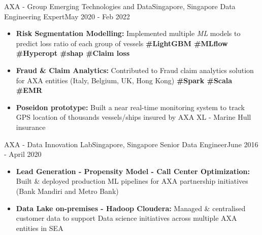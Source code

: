 
\resumeSubheading
{AXA - Group Emerging Technologies and Data}{Singapore, Singapore}
{Data Engineering Expert}{May 2020 - Feb 2022}
\begin{itemize}
    \item \textbf{Risk Segmentation Modelling:} Implemented multiple \emph{ML} models to predict loss ratio of each group of vessels \textbf{\scriptsize{\#LightGBM \#MLflow \#Hyperopt \#shap \#Claim loss}}
    \item \textbf{Fraud \& Claim Analytics:} Contributed to Fraud claim analytics solution for AXA entities (Italy, Belgium, UK, Hong Kong) \textbf{\scriptsize{\#Spark \#Scala \#EMR}}
    \item \textbf{Poseidon prototype:} Built a near real-time monitoring system to track GPS location of thousands vessels/ships insured by AXA XL - Marine Hull insurance
\end{itemize}


\resumeSubheading
{AXA - Data Innovation Lab}{Singapore, Singapore}
{Senior Data Engineer}{June 2016 - April 2020}
\begin{itemize}
    \item \textbf{Lead Generation - Propensity Model - Call Center Optimization:} Built \& deployed production ML pipelines for AXA partnership initiatives (Bank Mandiri and Metro Bank)
    \item \textbf{Data Lake on-premises - Hadoop Cloudera:} Managed \& centralised customer data to support Data science initiatives across multiple AXA entities in SEA
\end{itemize}

